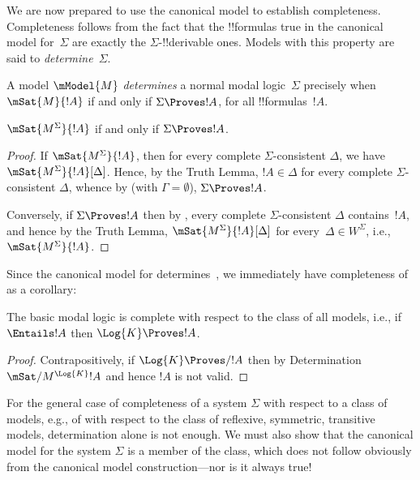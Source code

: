 \documentclass[../../../include/open-logic-section]{subfiles}
\begin{document}

We are now prepared to use the canonical model to establish
completeness. Completeness follows from the fact that the !!{formula}s
true in the canonical model for~$\Sigma$ are exactly the
$\Sigma$-!!{derivable} ones. Models with this property are said to
\emph{determine}~$\Sigma$.

\begin{defn}
  A model $\mModel{M}$ \emph{determines} a normal modal
  logic~$\Sigma$ precisely when $\mSat{M}{!A}$ if and only if $\Sigma
  \Proves !A$, for all !!{formula}s~$!A$.
\end{defn}

\begin{thm}[Determination]
   $\mSat{M^\Sigma}{!A}$ if and only if $\Sigma \Proves !A$.
\end{thm}

\begin{proof}
  If $\mSat{M^\Sigma}{!A}$, then for every complete
  $\Sigma$-consistent $\Delta$, we have
  $\mSat{M^\Sigma}{!A}[\Delta]$. Hence, by the Truth Lemma, $!A \in
  \Delta$ for every complete $\Sigma$-consistent $\Delta$, whence by
   (with $\Gamma =
  \emptyset$), $\Sigma \Proves !A$.

  Conversely, if $\Sigma \Proves !A$ then by
  , every
  complete $\Sigma$-consistent $\Delta$ contains~$!A$, and hence by
  the Truth Lemma, $\mSat{M^\Sigma}{!A}[\Delta]$ for every~$\Delta \in
  W^\Sigma$, i.e., $\mSat{M^\Sigma}{!A}$.
\end{proof}

Since the canonical model for  determines~, we
immediately have completeness of~ as a corollary:

\begin{cor}
  The basic modal logic  is complete with respect to the
  class of all models, i.e., if $\Entails !A$ then $\Log{K}
  \Proves !A$.
\end{cor}

\begin{proof}
  Contrapositively, if $\Log{K} \Proves/ !A$ then by Determination
  $\mSat/{M^{\Log{K}}}{!A}$ and hence $!A$ is not valid.
\end{proof}

For the general case of completeness of a system $\Sigma$ with respect
to a class of models, e.g., of  with respect to the class of
reflexive, symmetric, transitive models, determination alone is not
enough.  We must also show that the canonical model for the system
$\Sigma$ is a member of the class, which does not follow obviously
from the canonical model construction---nor is it always true!
\end{document}
